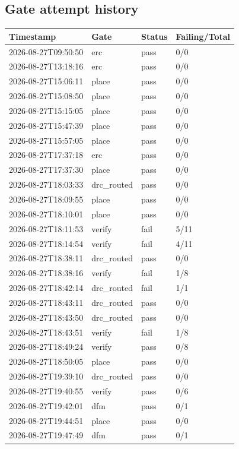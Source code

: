 \documentclass[11pt,a4paper]{article}
\begin{document}
\subsection*{Gate attempt history}
{\small
\begin{longtable}{llll}
\toprule
\textbf{Timestamp} & \textbf{Gate} & \textbf{Status} & \textbf{Failing/Total} \\
\midrule
\endhead
2026-08-27T09:50:50 & erc & pass & 0/0 \\
2026-08-27T13:18:16 & erc & pass & 0/0 \\
2026-08-27T15:06:11 & place & pass & 0/0 \\
2026-08-27T15:08:50 & place & pass & 0/0 \\
2026-08-27T15:15:05 & place & pass & 0/0 \\
2026-08-27T15:47:39 & place & pass & 0/0 \\
2026-08-27T15:57:05 & place & pass & 0/0 \\
2026-08-27T17:37:18 & erc & pass & 0/0 \\
2026-08-27T17:37:30 & place & pass & 0/0 \\
2026-08-27T18:03:33 & drc\_routed & pass & 0/0 \\
2026-08-27T18:09:55 & place & pass & 0/0 \\
2026-08-27T18:10:01 & place & pass & 0/0 \\
2026-08-27T18:11:53 & verify & fail & 5/11 \\
2026-08-27T18:14:54 & verify & fail & 4/11 \\
2026-08-27T18:38:11 & drc\_routed & pass & 0/0 \\
2026-08-27T18:38:16 & verify & fail & 1/8 \\
2026-08-27T18:42:14 & drc\_routed & fail & 1/1 \\
2026-08-27T18:43:11 & drc\_routed & pass & 0/0 \\
2026-08-27T18:43:50 & drc\_routed & pass & 0/0 \\
2026-08-27T18:43:51 & verify & fail & 1/8 \\
2026-08-27T18:49:24 & verify & pass & 0/8 \\
2026-08-27T18:50:05 & place & pass & 0/0 \\
2026-08-27T19:39:10 & drc\_routed & pass & 0/0 \\
2026-08-27T19:40:55 & verify & pass & 0/6 \\
2026-08-27T19:42:01 & dfm & pass & 0/1 \\
2026-08-27T19:44:51 & place & pass & 0/0 \\
2026-08-27T19:47:49 & dfm & pass & 0/1 \\
\bottomrule
\end{longtable}
}
\end{document}
